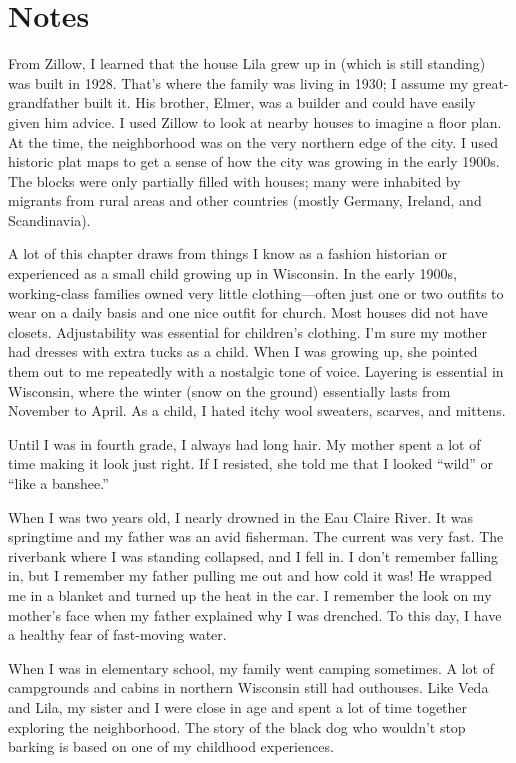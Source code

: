 \documentclass[
  letterpaper,
]{book}
\begin{document}
\section{Notes}\label{notes-3}

From Zillow, I learned that the house Lila grew up in (which is still
standing) was built in 1928. That's where the family was living in 1930;
I assume my great-grandfather built it. His brother, Elmer, was a
builder and could have easily given him advice. I used Zillow to look at
nearby houses to imagine a floor plan. At the time, the neighborhood was
on the very northern edge of the city. I used historic plat maps to get
a sense of how the city was growing in the early 1900s. The blocks were
only partially filled with houses; many were inhabited by migrants from
rural areas and other countries (mostly Germany, Ireland, and
Scandinavia).

A lot of this chapter draws from things I know as a fashion historian or
experienced as a small child growing up in Wisconsin. In the early
1900s, working-class families owned very little clothing---often just
one or two outfits to wear on a daily basis and one nice outfit for
church. Most houses did not have closets. Adjustability was essential
for children's clothing. I'm sure my mother had dresses with extra tucks
as a child. When I was growing up, she pointed them out to me repeatedly
with a nostalgic tone of voice. Layering is essential in Wisconsin,
where the winter (snow on the ground) essentially lasts from November to
April. As a child, I hated itchy wool sweaters, scarves, and mittens.

Until I was in fourth grade, I always had long hair. My mother spent a
lot of time making it look just right. If I resisted, she told me that I
looked ``wild'' or ``like a banshee.''

When I was two years old, I nearly drowned in the Eau Claire River. It
was springtime and my father was an avid fisherman. The current was very
fast. The riverbank where I was standing collapsed, and I fell in. I
don't remember falling in, but I remember my father pulling me out and
how cold it was! He wrapped me in a blanket and turned up the heat in
the car. I remember the look on my mother's face when my father
explained why I was drenched. To this day, I have a healthy fear of
fast-moving water.

When I was in elementary school, my family went camping sometimes. A lot
of campgrounds and cabins in northern Wisconsin still had outhouses.
Like Veda and Lila, my sister and I were close in age and spent a lot of
time together exploring the neighborhood. The story of the black dog who
wouldn't stop barking is based on one of my childhood experiences.
\end{document}
